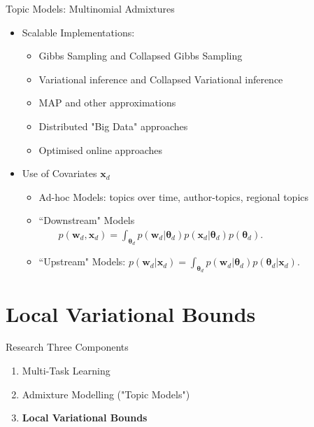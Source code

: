 \documentclass[xcolor=dvipsnames]{beamer}
\newcommand \vv[1] { \boldsymbol #1 }
\newcommand \wdoc      { { \vv{w}_d } }
\newcommand \thd[0]  { { \vv \theta_d } }
\newcommand \xd      { { \vv x_d } }
\begin{document}
\begin{frame}{Topic Models: Multinomial Admixtures}
\begin{itemize}
    \item<4-> Scalable Implementations: 
     { \begin{itemize}
        \item Gibbs Sampling\cite{Pritchard2000} and Collapsed Gibbs Sampling\cite{Griffiths2004} 
        \item Variational\cite{BleiNgJordan2003} inference and Collapsed Variational\cite{Teh2007}\cite{Hensman2012} inference
        \item MAP and other approximations\cite{Asuncion2012}
        \item Distributed "Big Data" approaches\cite{Smola2010}\cite{Newman2009}\cite{Chen2013}
        \item Optimised online approaches\cite{Hoffman2010}\cite{Hoffman2012}\cite{Mimno2012a}
    \end{itemize} }
    
    \item<5-> Use of Covariates $\vv{x}_d$
     { \begin{itemize}
        \item Ad-hoc Models: topics over time\cite{Wang2006}, author-topics\cite{MacCallum2007}, regional topics\cite{Eisenstein2010}
        \item ``Downstream" Models\cite{Blei2003}\cite{Salomatin2009}\cite{Virtanen2012a} \\$\qquad p(\wdoc,\xd) = \int_{\thd} p(\wdoc|\thd) p(\xd|\thd) p(\thd)$.
        \item ``Upstream" Models:\cite{Mimno2008} $p(\wdoc | \xd) = \int_{\thd} p(\wdoc|\thd) p(\thd|\xd)$.
    \end{itemize} 
    }
    
\end{itemize}


\end{frame}

\section{Local Variational Bounds}

\begin{frame}{Research}
Three Components


    \begin{enumerate}
        \item { \color{gray} Multi-Task Learning }
        \item { \color{gray} Admixture Modelling ("Topic Models")}
        \item { \bf Local Variational Bounds}
    \end{enumerate}


\end{frame}
\end{document}
